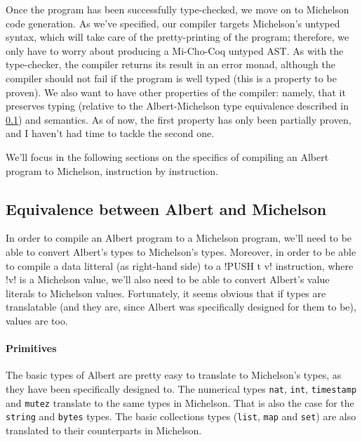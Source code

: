 \documentclass{report}
\begin{document}
Once the program has been successfully type-checked, we move on to Michelson code generation. As we've specified, our compiler targets Michelson's untyped syntax, which will take care of the pretty-printing of the program; therefore, we only have to worry about producing a Mi-Cho-Coq untyped AST. As with the type-checker, the compiler returns its result in an error monad, although the compiler should not fail if the program is well typed (this is a property to be proven). We also want to have other properties of the compiler: namely, that it preserves typing (relative to the Albert-Michelson type equivalence described in \ref{alberteqmichelson}) and semantics. As of now, the first property has only been partially proven, and I haven't had time to tackle the second one.

We'll focus in the following sections on the specifics of compiling an Albert program to Michelson, instruction by instruction.

\subsection{Equivalence between Albert and Michelson}
\label{alberteqmichelson}

In order to compile an Albert program to a Michelson program, we'll need to be able to convert Albert's types to Michelson's types. Moreover, in order to be able to compile a data litteral (as right-hand side) to a !PUSH t v! instruction, where !v! is a Michelson value, we'll also need to be able to convert Albert's value literals to Michelson values. Fortunately, it seems obvious that if types are translatable (and they are, since Albert was specifically designed for them to be), values are too.

\paragraph{Primitives}

The basic types of Albert are pretty easy to translate to Michelson's types, as they have been specifically designed to. The numerical types \texttt{nat}, \texttt{int}, \texttt{timestamp} and \texttt{mutez} translate to the same types in Michelson. That is also the case for the \texttt{string} and \texttt{bytes} types. The basic collections types (\texttt{list}, \texttt{map} and \texttt{set}) are also translated to their counterparts in Michelson.
\end{document}
